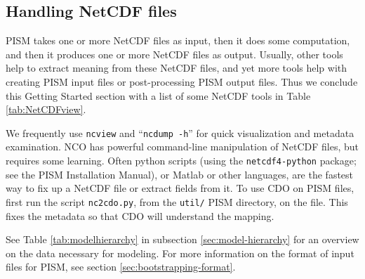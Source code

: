 

\subsection{Handling NetCDF files}\label{subsect:nctoolsintro}  PISM takes one or more NetCDF files as input, then it does some computation, and then it produces one or more NetCDF files as output.  Usually, other tools help to extract meaning from these NetCDF files, and yet more tools help with creating PISM input files or post-processing PISM output files.  Thus we conclude this Getting Started section with a list of some NetCDF tools in Table \ref{tab:NetCDFview}.

We frequently use \texttt{ncview} and ``\texttt{ncdump -h}'' for quick visualization and metadata examination.  NCO has powerful command-line manipulation of NetCDF files, but requires some learning.  Often python scripts (using the \texttt{netcdf4-python} package; see the PISM Installation Manual), or Matlab or other languages, are the fastest way to fix up a NetCDF file or extract fields from it.  To use CDO on PISM files, first run the script \texttt{nc2cdo.py}, from the \texttt{util/} PISM directory, on the file.  This fixes the metadata so that CDO will understand the mapping.

See Table \ref{tab:modelhierarchy} in subsection \ref{sec:model-hierarchy} for an overview on the data necessary for modeling.  For more information on the format of input files for PISM, see section \ref{sec:bootstrapping-format}.

